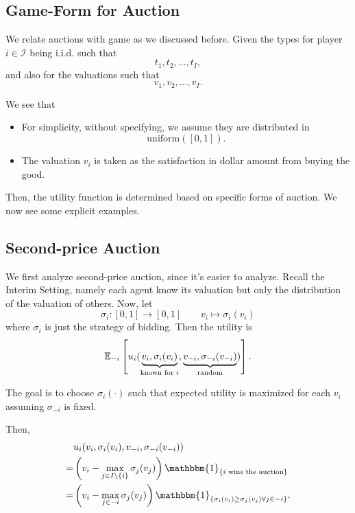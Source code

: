 \subsection{Game-Form for Auction}
We relate auctions with game as we discussed before. Given the types for player \(i\in \mathcal{I} \) being i.i.d. such that
\[
	t_1, t_2, \ldots , t_I,
\]
and also for the valuations such that
\[
	v_1, v_2, \ldots , v_I.
\]

\begin{note}
	We see that
	\begin{itemize}
		\item For simplicity, without specifying, we assume they are distributed in
		      \[
			      \mathrm{uniform} ([0, 1]).
		      \]
		\item The valuation \(v_{i}\) is taken as the satisfaction in dollar amount from buying the good.
	\end{itemize}
\end{note}

Then, the utility function is determined based on specific forms of auction. We now see some explicit examples.

\subsection{Second-price Auction}
We first analyze second-price auction, since it's easier to analyze. Recall the Interim Setting, namely each agent know its valuation but
only the distribution of the valuation of others. Now, let
\[
	\sigma_{i}\colon [0, 1]\to [0, 1]\qquad v_{i}\mapsto  \sigma_{i}(v_{i})
\]
where \(\sigma_{i}\) is just the strategy of bidding. Then the utility is
\[
	\mathbb{\MakeUppercase{E}}_{-i}\left[u_{i}(\underbrace{v_{i}, \sigma_{i}(v_{i})}_{\text{known for \(i\)}}, \underbrace{v_{-i}, \sigma_{-i}(v_{-i})}_{\text{random}})\right].
\]

The goal is to choose \(\sigma_{i}(\cdot)\) such that expected utility is maximized for each \(v_{i}\)
assuming \(\sigma_{-i}\) is fixed.

Then,
\[
	\begin{split}
		&u_{i}(v_{i}, \sigma_{i}(v_{i}), v_{-i}, \sigma_{-i}(v_{-i}))\\
		=&\left(v_{i} - \max_{j\in I\setminus\{i\}}\sigma_{j}(v_{j})\right)\mathbbm{1}_{\{\text{\(i\) wins the auction}\}}\\
		=&\left(v_{i} - \max_{j\in -i}\sigma_{j}(v_{j})\right)\mathbbm{1}_{\{ \sigma_{i}(v_{i})\geq \sigma_{j}(v_{j}) \forall j\in -i \}}.
	\end{split}
\]


